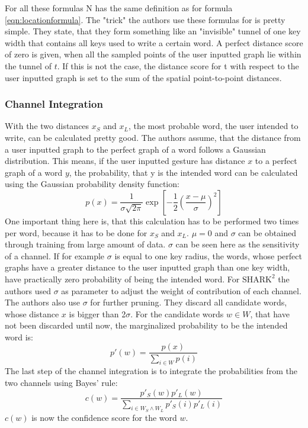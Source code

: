 For all these formulas N has the same definition as for formula \ref{eqn:locationformula}. The "trick" the authors use these formulas for is pretty simple. They state, that they form something like an "invisible" tunnel of one key width that contains all keys used to write a certain word. A perfect distance score of zero is given, when all the sampled points of the user inputted graph lie within the tunnel of $t$. If this is not the case, the distance score for t with respect to the user inputted graph is set to the sum of the spatial point-to-point distances.

\subsubsection{Channel Integration}
With the two distances $x_S$ and $x_L$, the most probable word, the user intended to write, can be calculated pretty good. The authors assume, that the distance from a user inputted graph to the perfect graph of a word follows a Gaussian distribution. This means, if the user inputted gesture has distance $x$ to a perfect graph of a word $y$, the probability, that y is the intended word can be calculated using the Gaussian probability density function:
\begin{equation}
    p(x) = \frac{1}{\sigma\sqrt{2\pi}}\exp\left[{-\frac{1}{2}}\left(\frac{x-\mu}{\sigma}\right)^2\right]
    \label{eqn:gaussian}
\end{equation}
One important thing here is, that this calculation has to be performed two times per word, because it has to be done for $x_S$ and $x_L$. $\mu = 0$ and $\sigma$ can be obtained through training from large amount of data. $\sigma$ can be seen here as the sensitivity of a channel. If for example $\sigma$ is equal to one key radius, the words, whose perfect graphs have a greater distance to the user inputted graph than one key width, have practically zero probability of being the intended word. For $\text{SHARK}^2$ the authors used $\sigma$ as parameter to adjust the weight of contribution of each channel.\\
The authors also use $\sigma$ for further pruning. They discard all candidate words, whose distance $x$ is bigger than 2$\sigma$. For the candidate words $w \in W$, that have not been discarded until now, the marginalized probability to be the intended word is: 
\begin{equation}
    p'(w) = \frac{p(x)}{\sum\limits_{i \in W}p(i)}
\end{equation}
The last step of the channel integration is to integrate the probabilities from the two channels using Bayes' rule:
\begin{equation}
    c(w) = \frac{p'_S(w)p'_L(w)}{\sum\limits_{i \in W_S \land W_L}p'_S(i)p'_L(i)}
\end{equation}
$c(w)$ is now the confidence score for the word $w$.

